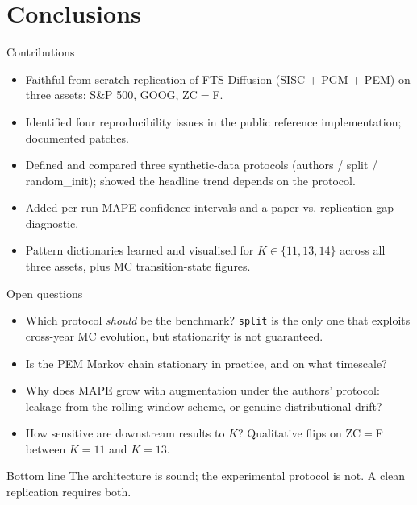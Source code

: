 \section{Conclusions}

\begin{frame}{Contributions}
\begin{itemize}\setlength\itemsep{4pt}
  \item Faithful from-scratch replication of FTS-Diffusion (SISC $+$ PGM $+$ PEM) on three assets: S\&P 500, GOOG, ZC$=$F.
  \item Identified four reproducibility issues in the public reference implementation; documented patches.
  \item Defined and compared three synthetic-data protocols (authors / split / random\_init); showed the headline trend depends on the protocol.
  \item Added per-run MAPE confidence intervals and a paper-vs.-replication gap diagnostic.
  \item Pattern dictionaries learned and visualised for $K\!\in\!\{11,13,14\}$ across all three assets, plus MC transition-state figures.
\end{itemize}
\end{frame}

\begin{frame}{Open questions}
\begin{itemize}\setlength\itemsep{4pt}
  \item Which protocol \emph{should} be the benchmark? \texttt{split} is the only one that exploits cross-year MC evolution, but stationarity is not guaranteed.
  \item Is the PEM Markov chain stationary in practice, and on what timescale?
  \item Why does MAPE grow with augmentation under the authors' protocol: leakage from the rolling-window scheme, or genuine distributional drift?
  \item How sensitive are downstream results to $K$? Qualitative flips on ZC$=$F between $K\!=\!11$ and $K\!=\!13$.
\end{itemize}
\begin{exampleblock}{Bottom line}
The architecture is sound; the experimental protocol is not. A clean replication requires both.
\end{exampleblock}
\end{frame}

